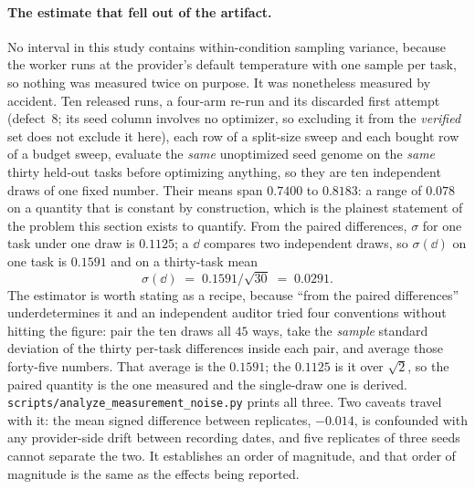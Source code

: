 \documentclass[11pt]{article}
\begin{document}
\paragraph{The estimate that fell out of the artifact.}
No interval in this study contains within-condition sampling
variance, because the worker runs at the provider's default temperature with one sample per
task, so nothing was measured twice on purpose. It was nonetheless measured by accident. Ten
released runs, a four-arm re-run and its discarded first attempt (defect~8; its seed column
involves no optimizer, so excluding it from the \emph{verified} set does not exclude it here),
each row of a split-size sweep and each bought row of a
budget sweep, evaluate the
\emph{same} unoptimized seed genome on the \emph{same} thirty held-out tasks before optimizing
anything, so they are ten independent draws of one fixed number. Their means span $0.7400$ to
$0.8183$: a range of $0.078$ on a quantity that is constant by construction, which is the
plainest statement of the problem this section exists to quantify.
From the paired differences, $\sigma$ for one task under one draw is $0.1125$; a $\dd$ compares
two independent draws, so $\sigma(\dd)$ on one task is $0.1591$ and on a thirty-task mean
\[
\sigma(\dd) \;=\; 0.1591/\sqrt{30} \;=\; 0.0291 .
\]
The estimator is worth stating as a recipe, because ``from the paired differences'' underdetermines
it and an independent auditor tried four conventions without hitting the figure: pair the ten draws
all $45$ ways, take the \emph{sample} standard deviation of the thirty per-task differences inside
each pair, and average those forty-five numbers. That average is the $0.1591$; the $0.1125$ is it
over $\sqrt{2}$, so the paired quantity is the one measured and the single-draw one is derived.
\texttt{scripts/analyze\_measurement\_noise.py} prints all three.
Two caveats travel with it: the mean signed difference
between replicates, $-0.014$, is confounded with any provider-side drift between recording
dates, and five replicates of three seeds cannot separate the two. It establishes an order of
magnitude, and that order of magnitude is the same as the effects being reported.
\end{document}
